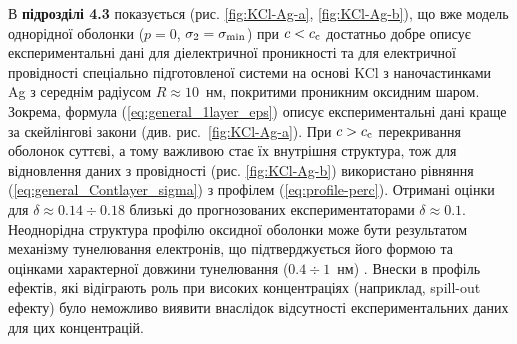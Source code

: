 \documentclass[twoside,a4paper,14pt]{vakaref}
\begin{document}
В {\bf підрозділі 4.3} показується (рис. \ref{fig:KCl-Ag-a}, \ref{fig:KCl-Ag-b}), що вже модель однорідної оболонки ($p=0$, $\sigma_2 = \sigma_{\rm min}$) при $c < c_{\rm c}$ достатньо добре описує експериментальні дані \cite{Grannan1981} для діелектричної проникності та \cite{ChenI.-G.1986} для електричної провідності спеціально підготовленої системи на основі KCl з наночастинками Ag з середнім радіусом $R\approx 10$~нм, покритими проникним оксидним шаром. 
Зокрема, формула (\ref{eq:general_1layer_eps}) описує експериментальні дані краще за скейлінгові закони (див. рис.~\ref{fig:KCl-Ag-a}). 
При  $c > c_{\rm c}$ перекривання оболонок суттєві, а тому важливою стає їх внутрішня структура, тож для відновлення даних з провідності (рис. \ref{fig:KCl-Ag-b}) використано рівняння (\ref{eq:general_Contlayer_sigma}) з профілем (\ref{eq:profile-perc}).
Отримані оцінки для $\delta \approx 0.14 \div 0.18$ близькі до прогнозованих експериментаторами $\delta \approx 0.1$.
Неоднорідна структура профілю оксидної оболонки може бути результатом механізму тунелювання електронів, що підтверджується його формою та оцінками характерної довжини тунелювання ($0.4\div 1$~нм) \cite{Ambrosetti2009}. 
Внески в профіль ефектів, які відіграють роль при високих концентраціях (наприклад, spill-out ефекту) було неможливо виявити внаслідок відсутності експериментальних даних для цих концентрацій.
\end{document}
